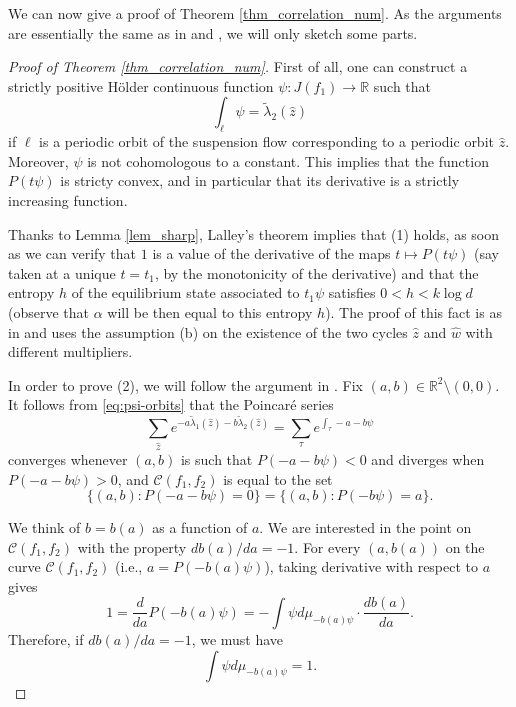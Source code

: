 \documentclass[11pt]{amsart}
\theoremstyle{plain}
\theoremstyle{definition}
\theoremstyle{remark}
\begin{document}
We can now give a proof of Theorem \ref{thm_correlation_num}. As the arguments are essentially the same as in \cite{SchwartzSharp93} and \cite{Sharp98}, we will only sketch some parts.

\begin{proof}[Proof of Theorem \ref{thm_correlation_num}]
First of all, one can
construct
a strictly positive H\"older continuous function $\psi \colon J(f_1) \to \mathbb{R}$ such that
\begin{equation}\label{eq:psi-orbits}
\int_{\ell} \psi = \widetilde{\lambda}_2(\hat{z})
\end{equation}
if $\ell$ 
is a periodic orbit of the suspension flow corresponding to a periodic orbit $\hat{z}$.
Moreover, $\psi$ is not cohomologous to a constant.
This implies that the function $P(t\psi)$ is stricty convex, and in particular that 
its
derivative is a strictly increasing function.

\medskip

Thanks to Lemma \ref{lem_sharp},
Lalley's theorem \cite{Lalley87} implies that
(1) holds,
as soon as we can verify that $1$ is a value of the derivative of the maps $t\mapsto P(t\psi)$
(say taken at a unique $t=t_1$, by the monotonicity of the derivative)
and that
the entropy $h$
of the equilibrium state associated to 
$t_1\psi$ satisfies $0<h< k\log d$ 
(observe that $\alpha$ will be then equal to this entropy $h$). 
The proof of this fact
is as in \cite{SchwartzSharp93}
and uses the
assumption (b)
on the
existence of the two cycles $\hat z$ and $\hat w$ with different multipliers.


\bigskip

In order to prove
(2), we will follow
the argument in
\cite[Section 2]{Sharp98}.
Fix $(a,b)\in \mathbb R^2\setminus (0,0)$.
It follows
from \eqref{eq:psi-orbits}
that
the Poincar\'e series
\[\sum_{\hat{z}} e^{-a\widetilde{\lambda}_1(\hat{z}) - b\widetilde{\lambda}_2(\hat{z})} = \sum_{\tau} e^{\int_\tau -a-b\psi}\]
converges whenever $(a,b)$ 
is such that 
 $P(-a-b\psi)<0$
 and diverges when $P(-a-b\psi)>0$, and $\mathcal{C}(f_1,f_2)$ is
equal to
 the set
$$\{(a,b) : P(-a-b\psi)=0\} = \{(a,b) : P(-b\psi)=a\}.$$

We think of $b = b(a)$ as a function of $a$. We are interested in the point on $\mathcal{C}(f_1,f_2)$ with the property $db(a)/da = -1$. For every $(a,b(a))$ on the curve $\mathcal{C}(f_1,f_2)$ (i.e., $a = P(-b(a)\psi)$), taking derivative with respect to $a$ gives
\begin{equation*}
1 = \frac{d}{da}P(-b(a)\psi)
 = -\int \psi d\mu_{-b(a)\psi} \cdot \frac{db(a)}{da}.
\end{equation*}
Therefore, if $db(a)/da =- 1$, we must have
\begin{equation*}
\int \psi d\mu_{-b(a)\psi} = 1.
\end{equation*}


\end{proof}
\end{document}
